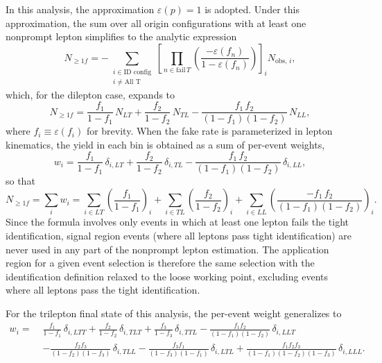 In this analysis, the approximation $\varepsilon(p) = 1$ is adopted. Under this approximation, the sum over all origin configurations with at least one nonprompt lepton simplifies to the analytic expression~\cite{CMSFRMethod}
\begin{equation}
  N_{\geq 1f} = -\sum_{\substack{i\in\text{ID config}\\i\neq\text{All T}}}\left[\prod_{n\in\text{fail}\,T}\left(\frac{-\varepsilon(f_{n})}{1-\varepsilon(f_{n})}\right)\right]_{i} N_{\text{obs},\,i},
  \label{eq:fakerate_sum}
\end{equation}
which, for the dilepton case, expands to
\begin{equation}
  N_{\geq 1f} = \frac{f_{1}}{1-f_{1}}\,N_{LT} + \frac{f_{2}}{1-f_{2}}\,N_{TL} - \frac{f_{1}\,f_{2}}{(1-f_{1})(1-f_{2})}\,N_{LL},
  \label{eq:fakerate_dilep}
\end{equation}
where $f_{i} \equiv \varepsilon(f_{i})$ for brevity. When the fake rate is parameterized in lepton kinematics, the yield in each bin is obtained as a sum of per-event weights,
\begin{equation}
  w_{i} = \frac{f_{1}}{1-f_{1}}\,\delta_{i,LT} + \frac{f_{2}}{1-f_{2}}\,\delta_{i,TL} - \frac{f_{1}\,f_{2}}{(1-f_{1})(1-f_{2})}\,\delta_{i,LL},
  \label{eq:fakerate_weight}
\end{equation}
so that
\begin{equation}
  N_{\geq 1f} = \sum_{i} w_{i} = \sum_{i\in LT}\!\left(\frac{f_{1}}{1-f_{1}}\right)_{\!i} + \sum_{i\in TL}\!\left(\frac{f_{2}}{1-f_{2}}\right)_{\!i} + \sum_{i\in LL}\!\left(\frac{-f_{1}\,f_{2}}{(1-f_{1})(1-f_{2})}\right)_{\!i}.
  \label{eq:fakerate_yield}
\end{equation}
Since the formula involves only events in which at least one lepton fails the tight identification, signal region events (where all leptons pass tight identification) are never used in any part of the nonprompt lepton estimation. The application region for a given event selection is therefore the same selection with the identification definition relaxed to the loose working point, excluding events where all leptons pass the tight identification.

For the trilepton final state of this analysis, the per-event weight generalizes to
\begin{align}
  w_{i} =\;& \frac{f_{1}}{1{-}f_{1}}\,\delta_{i,LTT} + \frac{f_{2}}{1{-}f_{2}}\,\delta_{i,TLT} + \frac{f_{3}}{1{-}f_{3}}\,\delta_{i,TTL}
           - \frac{f_{1}f_{2}}{(1{-}f_{1})(1{-}f_{2})}\,\delta_{i,LLT} \nonumber \\
          &- \frac{f_{2}f_{3}}{(1{-}f_{2})(1{-}f_{3})}\,\delta_{i,TLL}
           - \frac{f_{3}f_{1}}{(1{-}f_{3})(1{-}f_{1})}\,\delta_{i,LTL}
           + \frac{f_{1}f_{2}f_{3}}{(1{-}f_{1})(1{-}f_{2})(1{-}f_{3})}\,\delta_{i,LLL}.
  \label{eq:fakerate_trilep}
\end{align}

